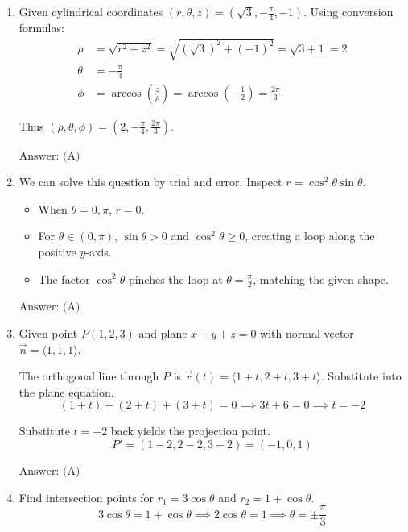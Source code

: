 \documentclass[a4paper, 12pt]{article}
\begin{document}


\begin{enumerate}[leftmargin=*,label=\textbf{\arabic*.}]

\item Given cylindrical coordinates $(r, \theta, z) = \left(\sqrt{3}, -\frac{\pi}{4}, -1\right)$. Using conversion formulas:
\begin{align*}
\rho &= \sqrt{r^2 + z^2} = \sqrt{(\sqrt{3})^2 + (-1)^2} = \sqrt{3 + 1} = 2 \\
\theta &= -\frac{\pi}{4} \\
\phi &= \arccos\left(\frac{z}{\rho}\right) = \arccos\left(-\frac{1}{2}\right) = \frac{2\pi}{3}
\end{align*}

Thus $(\rho, \theta, \phi) = \left(2, -\frac{\pi}{4}, \frac{2\pi}{3}\right)$.

$\boxed{\text{Answer: (A)}}$

\item We can solve this question by trial and error. Inspect $r = \cos^2\theta \sin\theta$.
\begin{itemize}[leftmargin=*]
    \item When $\theta = 0, \pi$, $r = 0$.
    \item For $\theta \in (0, \pi)$, $\sin\theta > 0$ and $\cos^2\theta \ge 0$, creating a loop along the positive $y$-axis.
    \item The factor $\cos^2\theta$ pinches the loop at $\theta = \frac{\pi}{2}$, matching the given shape.
\end{itemize}

$\boxed{\text{Answer: (A)}}$

\item Given point $P(1,2,3)$ and plane $x + y + z = 0$ with normal vector $\vec{n} = \langle 1, 1, 1 \rangle$.

The orthogonal line through $P$ is $\vec{r}(t) = \langle 1+t, 2+t, 3+t \rangle$. Substitute into the plane equation.
\[(1+t) + (2+t) + (3+t) = 0 \implies 3t + 6 = 0 \implies t = -2\]

Substitute $t = -2$ back yields the projection point.
\[P' = (1 - 2, 2 - 2, 3 - 2) = (-1, 0, 1)\]

$\boxed{\text{Answer: (A)}}$

\item Find intersection points for $r_1 = 3\cos\theta$ and $r_2 = 1 + \cos\theta$.
\[3\cos\theta = 1 + \cos\theta \implies 2\cos\theta = 1 \implies \theta = \pm \frac{\pi}{3}\]


\end{enumerate}
\end{document}
